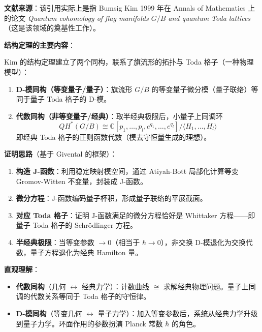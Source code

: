 \textbf{文献来源}：该引用实际上是指 Bumsig Kim 1999 年在 Annals of Mathematics 上的论文 \textit{Quantum cohomology of flag manifolds $G/B$ and quantum Toda lattices}（这是该领域的奠基性工作）。

\textbf{结构定理的主要内容}：

Kim 的结构定理建立了两个同构，联系了旗流形的拓扑与 Toda 格子（一种物理模型）：

\begin{enumerate}
\item \textbf{D-模同构（等变量子/量子）}：旗流形 $G/B$ 的等变量子微分模（量子联络）等同于量子 Toda 格子的 D-模。

\item \textbf{代数同构（非等变量子/经典）}：取半经典极限后，小量子上同调环
\[
QH^*(G/B) \cong \mathbb{C}[p_1, \ldots, p_l, e^{q_1}, \ldots, e^{q_l}] / \langle H_1, \ldots, H_l \rangle
\]
即经典 Toda 格子的正则函数代数（模去守恒量生成的理想）。
\end{enumerate}

\textbf{证明思路}（基于 Givental 的框架）：

\begin{enumerate}
\item \textbf{构造 J-函数}：利用稳定映射模空间，通过 Atiyah-Bott 局部化计算等变 Gromov-Witten 不变量，封装成 J-函数。

\item \textbf{微分方程}：J-函数编码量子杯积，形成量子联络的平展截面。

\item \textbf{对应 Toda 格子}：证明 J-函数满足的微分方程恰好是 Whittaker 方程——即量子 Toda 格子的 Schrödlinger 方程。

\item \textbf{半经典极限}：当等变参数 $\to 0$（相当于 $\hbar \to 0$），非交换 D-模退化为交换代数，量子方程退化为经典 Hamilton 量。
\end{enumerate}

\textbf{直观理解}：

\begin{itemize}
\item \textbf{代数同构}（几何 $\leftrightarrow$ 经典力学）：计数曲线 $\cong$ 求解经典物理问题。量子上同调的代数关系等同于 Toda 格子的守恒律。

\item \textbf{D-模同构}（等变几何 $\leftrightarrow$ 量子力学）：加入等变参数后，系统从经典力学升级到量子力学。环面作用的参数扮演 Planck 常数 $\hbar$ 的角色。
\end{itemize}

